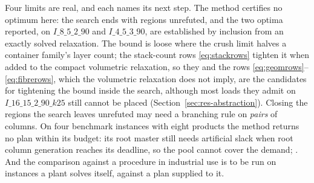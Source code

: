 Four limits are real, and each names its next step. The method
certifies no optimum here: the search ends with regions unrefuted, and
the two optima reported, on $I\_8\_5\_2\_90$ and $I\_4\_5\_3\_90$, are
established by inclusion from an exactly solved relaxation. The bound is loose where the crush limit halves a
container family's layer count; the stack-count rows
\eqref{eq:stackrows} tighten it when added to the compact volumetric
relaxation, so they and the rows \eqref{eq:geomrows}--\eqref{eq:fibrerows},
which the volumetric relaxation does not imply, are the candidates for
tightening the bound inside the search, although most loads they admit
on $I\_16\_15\_2\_90\_k25$ still cannot be placed
(Section~\ref{sec:res-abstraction}). Closing the regions the search
leaves unrefuted may need a branching rule on \emph{pairs} of columns.
On four benchmark instances with eight products the method returns no
plan within its budget: its root master still needs artificial slack
when root column generation reaches its deadline, so the pool cannot
cover the demand; . And the
comparison against a procedure in industrial use is to be run on
instances a plant solves itself, against a plan supplied to it.
